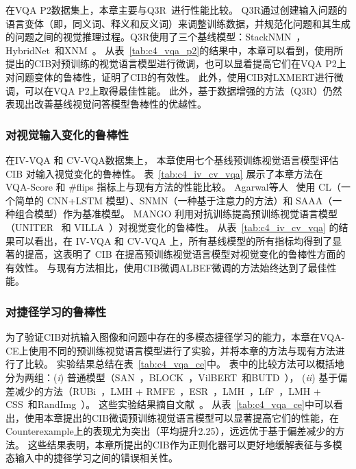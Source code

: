 在VQA P2数据集上，本章主要与Q3R~\cite{whitehead2020learning}进行性能比较。
Q3R通过创建输入问题的语言变体（即，同义词、释义和反义词）来调整训练数据，并规范化问题和其生成的问题之间的视觉推理过程。Q3R使用了三个基线模型：StackNMN~\cite{hu2018explainable}，HybridNet~\cite{whitehead2020learning}和XNM~\cite{shi2019xnm}。
从表~\ref{tab:c4_vqa_p2}的结果中，本章可以看到，使用所提出的CIB对预训练的视觉语言模型进行微调，也可以显着提高它们在VQA P2上对问题变体的鲁棒性，证明了CIB的有效性。
此外，使用CIB对LXMERT进行微调，可以在VQA P2上取得最佳性能。
此外，基于数据增强的方法（Q3R）仍然表现出改善基线视觉问答模型鲁棒性的优越性。





\subsubsection{对视觉输入变化的鲁棒性}

在IV-VQA 和 CV-VQA数据集上， 本章使用七个基线预训练视觉语言模型评估 CIB 对输入视觉变化的鲁棒性。
表~\ref{tab:c4_iv_cv_vqa} 展示了本章方法在 VQA-Score 和 \#flips 指标上与现有方法的性能比较。
Agarwal等人~\cite{agarwal2020towards} 使用 CL（一个简单的 CNN+LSTM 模型）、SNMN（一种基于注意力的方法）和 SAAA（一种组合模型）作为基准模型。
MANGO 利用对抗训练提高预训练视觉语言模型（UNITER~\cite{chen2020uniter} 和 VILLA~\cite{gan2020large}）对视觉变化的鲁棒性。
从表~\ref{tab:c4_iv_cv_vqa} 的结果可以看出，在 IV-VQA 和 CV-VQA 上，所有基线模型的所有指标均得到了显著的提高，这表明了 CIB 在提高预训练视觉语言模型对视觉变化的鲁棒性方面的有效性。
与现有方法相比，使用CIB微调ALBEF微调的方法始终达到了最佳性能。





\subsubsection{对捷径学习的鲁棒性}
为了验证CIB对抗输入图像和问题中存在的多模态捷径学习的能力，本章在VQA-CE上使用不同的预训练视觉语言模型进行了实验，并将本章的方法与现有方法进行了比较。
实验结果总结在表~\ref{tab:c4_vqa_ce}中。
表中的比较方法可以概括地分为两组：(\emph{i}) 普通模型（SAN~\cite{yang2016stacked}，BLOCK~\cite{ben2019block}，VilBERT~\cite{lu2019vilbert}和BUTD~\cite{anderson2018bottom}），
(\emph{ii}) 基于偏差减少的方法（RUBi~\cite{cadene2019rubi}，LMH + RMFE~\cite{gat2020removing}，ESR~\cite{shrestha2020negative}，LMH~\cite{clark2019don}，LfF~\cite{nam2020learning}，LMH + CSS~\cite{chen2020counterfactual}和RandImg~\cite{teney2020value}）。
这些实验结果摘自文献~\cite{dancette2021beyond}。
从表~\ref{tab:c4_vqa_ce}中可以看出，使用本章提出的CIB微调预训练视觉语言模型可以显著提高它们的性能，在Counterexample上的表现尤为突出（平均提升2.25），远远优于基于偏差减少的方法。
这些结果表明，本章所提出的CIB作为正则化器可以更好地缓解表征与多模态输入中的捷径学习之间的错误相关性。



